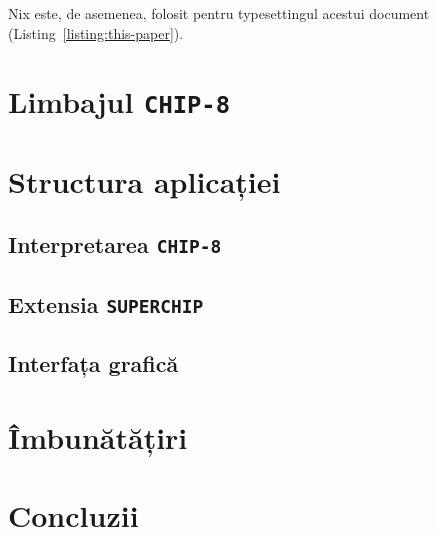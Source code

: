 \documentclass[a4paper]{article}
\begin{document}
Nix este, de asemenea, folosit pentru typesettingul acestui document (Listing~\ref{listing:this-paper}).

\section{Limbajul \texttt{CHIP-8}}

\section{Structura aplicației}
\subsection{Interpretarea \texttt{CHIP-8}}
\subsection{Extensia \texttt{SUPERCHIP}}
\subsection{Interfața grafică}

\section{Îmbunătățiri}

\section{Concluzii}

\newpage
\printbibliography[title=\section{Bibliografie}]

\renewcommand\listoflistingscaption{\section{Listinguri de cod sursă}}
\listoflistings
\end{document}
